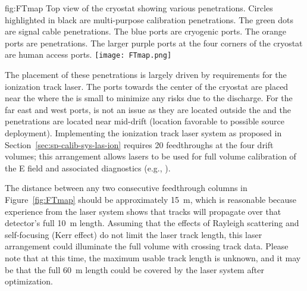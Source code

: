 
\begin{dunefigure}{fig:FTmap}
{Top view of the \spmod %
cryostat showing various penetrations. Circles highlighted in black are multi-purpose calibration penetrations. The green dots are  signal cable penetrations. The blue ports are cryogenic ports. The orange ports are  penetrations. The larger purple ports at the four corners of the cryostat are human access ports.}
\texttt{[image: FTmap.png]}
\end{dunefigure}





The placement of these penetrations is largely driven by requirements for the ionization track laser. %
The ports %
towards the center of the cryostat are placed near the  where the \efield is small  to minimize any risks due to the  discharge. For the far east and west ports,  is not an issue as they are located outside the  and the penetrations are located near mid-drift (location favorable to possible source deployment).
Implementing the ionization track laser system as proposed in Section~\ref{sec:sp-calib-sys-las-ion} requires \num{20} feedthroughs at the four  drift volumes; this arrangement allows lasers to be used for full volume calibration of the E field and associated diagnostics (e.g., ). 

The distance between any two consecutive feedthrough columns in Figure~\ref{fig:FTmap} should be approximately \SI{15}{\m}, which is reasonable because experience from the \microboone laser system shows that tracks will propagate over that detector's full \SI{10}{\m} length. Assuming that the effects of Rayleigh scattering and self-focusing (Kerr effect) do not limit the laser track length, this laser arrangement could illuminate the full volume with crossing track data.  Please note that at this time, the maximum usable track length is unknown, and it may be that the full \SI{60}{\m} \detmodule length could be covered by the laser system after optimization.



